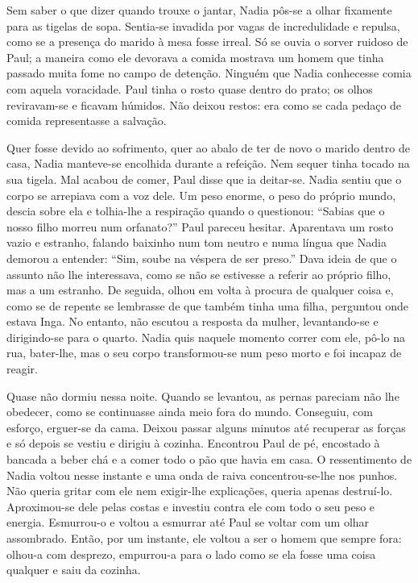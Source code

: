 Sem saber o que dizer quando trouxe o jantar, Nadia pôs-se a olhar
fixamente para as tigelas de sopa. Sentia-se invadida por vagas de
incredulidade e repulsa, como se a presença do marido à mesa fosse
irreal. Só se ouvia o sorver ruidoso de Paul; a maneira como ele
devorava a comida mostrava um homem que tinha passado muita fome no
campo de detenção. Ninguém que Nadia conhecesse comia com aquela
voracidade. Paul tinha o rosto quase dentro do prato; os olhos
reviravam-se e ficavam húmidos. Não deixou restos: era como se cada
pedaço de comida representasse a salvação.

Quer fosse devido ao sofrimento, quer ao abalo de ter de novo o marido
dentro de casa, Nadia manteve-se encolhida durante a refeição. Nem
sequer tinha tocado na sua tigela. Mal acabou de comer, Paul disse que
ia deitar-se. Nadia sentiu que o corpo se arrepiava com a voz dele. Um
peso enorme, o peso do próprio mundo, descia sobre ela e
tolhia-lhe a respiração quando o questionou: ``Sabias que o nosso filho
morreu num orfanato?'' Paul pareceu hesitar. Aparentava um rosto vazio e
estranho, falando baixinho num tom neutro e numa língua que Nadia
demorou a entender: ``Sim, soube na véspera de ser preso.'' Dava ideia de
que o assunto não lhe interessava, como se não se estivesse a referir
ao próprio filho, mas a um estranho. De seguida, olhou em volta à
procura de qualquer coisa e, como se de repente se lembrasse de que
também tinha uma filha, perguntou onde estava Inga. No entanto, não
escutou a resposta da mulher, levantando-se e dirigindo-se para o
quarto. Nadia quis naquele momento correr com ele, pô-lo na rua,
bater-lhe, mas o seu corpo transformou-se num peso morto e foi incapaz
de reagir.

Quase não dormiu nessa noite. Quando se levantou, as
pernas pareciam não lhe obedecer, como se continuasse ainda meio fora do
mundo. Conseguiu, com esforço, erguer-se da cama. Deixou passar alguns
minutos até recuperar as forças e só depois se vestiu e dirigiu à
cozinha. Encontrou Paul de pé, encostado à bancada a beber chá e a comer
todo o pão que havia em casa. O ressentimento de Nadia voltou nesse
instante e uma onda de raiva concentrou-se-lhe nos punhos. Não queria
gritar com ele nem exigir-lhe explicações, queria apenas destruí-lo.
Aproximou-se dele pelas costas e investiu contra ele com todo o seu peso
e energia. Esmurrou-o e voltou a esmurrar até Paul se voltar com um
olhar assombrado. Então, por um instante, ele voltou a ser o homem que
sempre fora: olhou-a com desprezo, empurrou-a para o lado como se ela
fosse uma coisa qualquer e saiu da cozinha.

